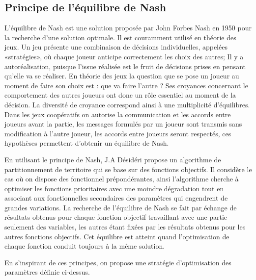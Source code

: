 
 \subsection{Principe de l’\'{e}quilibre de Nash}
 
L'\'{e}quilibre de Nash est une solution propos\'{e}e par John Forbes Nash en 1950 \citep{depriester1950johnnash} pour la recherche d’une solution optimale. Il est couramment utilis\'{e} en th\'{e}orie des jeux. Un jeu pr\'{e}sente une combinaison de d\'{e}cisions individuelles, appel\'{e}es «strat\'{e}gies», où chaque joueur anticipe correctement les choix des autres; Il y a autor\'{e}alisation, puisque l'issue r\'{e}alis\'{e}e est le fruit de d\'{e}cisions prises en pensant qu'elle va se r\'{e}aliser. En th\'{e}orie des jeux la question que se pose un joueur au moment de faire son choix est : que va faire l'autre ? Ses croyances concernant le comportement des autres joueurs ont donc un rôle essentiel au moment de la d\'{e}cision. La diversit\'{e} de croyance correspond ainsi \`{a} une multiplicit\'{e} d'\'{e}quilibres. Dans les jeux coop\'{e}ratifs on autorise la communication et les accords entre joueurs avant la partie, les messages formul\'{e}s par un joueur sont transmis sans modification \`{a} l'autre joueur, les accords entre joueurs seront respect\'{e}s, ces hypoth\`{e}ses permettent d'obtenir un \'{e}quilibre de Nash.

En utilisant le principe de Nash, J.A D\'{e}sid\'{e}ri \citep{depriester2007jeanantoine} propose un algorithme de partitionnement de territoire qui se base sur des fonctions objectifs. Il consid\`{e}re le cas où on dispose des fonctionnel pr\'{e}pond\'{e}rantes, ainsi l'algorithme cherche \`{a} optimiser les fonctions prioritaires avec une moindre d\'{e}gradation tout en associant aux fonctionnelles secondaires des param\`{e}tres qui engendrent de grandes variations. La recherche de l’\'{e}quilibre de Nash se fait par \'{e}change de r\'{e}sultats obtenus pour chaque fonction objectif travaillant avec une partie seulement des variables, les autres \'{e}tant fix\'{e}es par les r\'{e}sultats obtenus pour les autres fonctions objectifs. Cet \'{e}quilibre est atteint quand l’optimisation de chaque fonction conduit toujours \`{a} la m\^{e}me solution.

En s'inspirant de ces principes, on propose une strat\'{e}gie d'optimisation des param\`{e}tres définie ci-dessus.